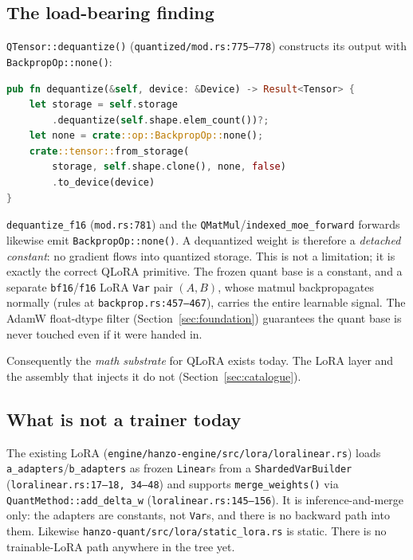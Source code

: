 \documentclass[11pt]{article}
\begin{document}
\subsection{The load-bearing finding}

\texttt{QTensor::dequantize()} (\texttt{quantized/mod.rs:775--778}) constructs its output with \texttt{BackpropOp::none()}:

\begin{lstlisting}[language=Rust]
pub fn dequantize(&self, device: &Device) -> Result<Tensor> {
    let storage = self.storage
        .dequantize(self.shape.elem_count())?;
    let none = crate::op::BackpropOp::none();
    crate::tensor::from_storage(
        storage, self.shape.clone(), none, false)
        .to_device(device)
}
\end{lstlisting}

\texttt{dequantize\_f16} (\texttt{mod.rs:781}) and the \texttt{QMatMul}/\texttt{indexed\_moe\_forward} forwards likewise emit \texttt{BackpropOp::none()}. A dequantized weight is therefore a \emph{detached constant}: no gradient flows into quantized storage. This is not a limitation; it is exactly the correct QLoRA primitive. The frozen quant base is a constant, and a separate \texttt{bf16}/\texttt{f16} LoRA \texttt{Var} pair $(A, B)$, whose matmul backpropagates normally (rules at \texttt{backprop.rs:457--467}), carries the entire learnable signal. The AdamW float-dtype filter (Section~\ref{sec:foundation}) guarantees the quant base is never touched even if it were handed in.

Consequently the \emph{math substrate} for QLoRA exists today. The LoRA layer and the assembly that injects it do not (Section~\ref{sec:catalogue}).

\subsection{What is not a trainer today}

The existing LoRA (\texttt{engine/hanzo-engine/src/lora/loralinear.rs}) loads \texttt{a\_adapters}/\texttt{b\_adapters} as frozen \texttt{Linear}s from a \texttt{ShardedVarBuilder} (\texttt{loralinear.rs:17--18, 34--48}) and supports \texttt{merge\_weights()} via \texttt{QuantMethod::add\_delta\_w} (\texttt{loralinear.rs:145--156}). It is inference-and-merge only: the adapters are constants, not \texttt{Var}s, and there is no backward path into them. Likewise \texttt{hanzo-quant/src/lora/static\_lora.rs} is static. There is no trainable-LoRA path anywhere in the tree yet.
\end{document}
